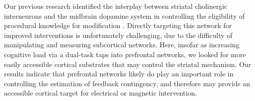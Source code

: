 \documentclass[apacite,draftfirst,man]{apa6}
\begin{document}
Our previous research identified the interplay between striatal cholinergic
interneurons and the midbrain dopamine system in controlling the eligibility of
procedural knowledge for modification \cite{AshbyCrossley2011,
crossley_erasing_2013}. Directly targeting this network for improved
interventions is unfortunately challenging, due to the difficulty of
manipulating and measuring subcortical networks. Here, insofar as increasing
cognitive load via a dual-task taps into prefrontal networks, we looked for more
easily accessible cortical substrates that may control the striatal mechanism.
Our results indicate that prefrontal networks likely do play an important role
in controlling the estimation of feedback contingency, and therefore may provide
an accessible cortical target for electrical or magnetic intervention.


\end{document}
